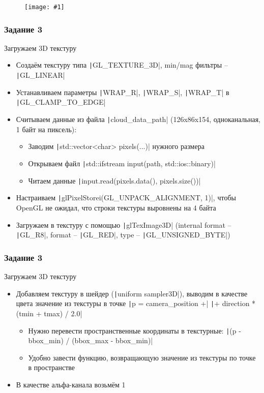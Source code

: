 \documentclass[10pt]{beamer}
\newcommand{\slideimage}[1]{
  \begin{figure}
    \begin{adjustbox}{width=\textwidth, totalheight=\textheight-2\baselineskip-2\baselineskip,keepaspectratio}
      \texttt{[image: \#1]}
    \end{adjustbox}
  \end{figure}
}
\begin{document}
\begin{frame}[fragile]
\slideimage{2.png}
\end{frame}

\begin{frame}[fragile]
\fontsize{10pt}{10pt}
\frametitle{Задание 3}
Загружаем 3D текстуру
\begin{itemize}
\item Создаём текстуру типа \texttt|GL_TEXTURE_3D|, min/mag фильтры -- \texttt|GL_LINEAR|
\item Устанавливаем параметры \texttt|WRAP_R|, \texttt|WRAP_S|, \texttt|WRAP_T| в \texttt|GL_CLAMP_TO_EDGE|
\item Считываем данные из файла \texttt|cloud_data_path| (126x86x154, одноканальная, 1 байт на пиксель):
\begin{itemize}
\item Заводим \texttt|std::vector<char> pixels(...)| нужного размера
\item Открываем файл \texttt|std::ifstream input(path, std::ios::binary)|
\item Читаем данные \texttt|input.read(pixels.data(), pixels.size())|
\end{itemize}
\item Настраиваем \texttt|glPixelStorei(GL_UNPACK_ALIGNMENT, 1)|, чтобы OpenGL не ожидал, что строки текстуры выровнены на 4 байта
\item Загружаем в текстуру с помощью \texttt|glTexImage3D| (internal format -- \texttt|GL_R8|, format -- \texttt|GL_RED|, type -- \texttt|GL_UNSIGNED_BYTE|)
\end{itemize}
\end{frame}

\begin{frame}[fragile]
\frametitle{Задание 3}
Загружаем 3D текстуру
\begin{itemize}
\item Добавляем текстуру в шейдер (\texttt|uniform sampler3D|), выводим в качестве цвета значение из текстуры в точке \texttt|p = camera_position +|
\texttt|+ direction * (tmin + tmax) / 2.0|
\begin{itemize}
\item Нужно перевести пространственные координаты в текстурные: \texttt|(p - bbox_min) / (bbox_max - bbox_min)|
\item Удобно завести функцию, возвращающую значение из текстуры по точке в пространстве
\end{itemize}
\item В качестве альфа-канала возьмём 1
\end{itemize}
\end{frame}
\end{document}
